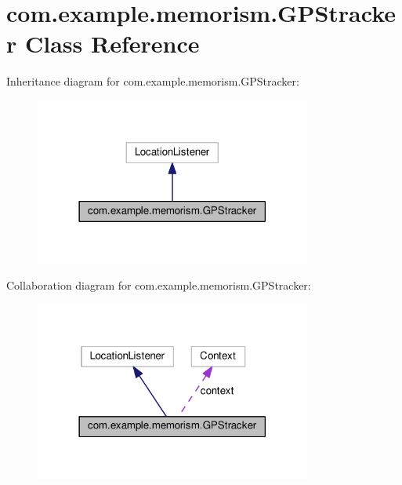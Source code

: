 \hypertarget{classcom_1_1example_1_1memorism_1_1_g_p_stracker}{}\section{com.\+example.\+memorism.\+G\+P\+Stracker Class Reference}
\label{classcom_1_1example_1_1memorism_1_1_g_p_stracker}


Inheritance diagram for com.\+example.\+memorism.\+G\+P\+Stracker\+:
\nopagebreak
\begin{figure}[H]
\begin{center}
\leavevmode
\includegraphics[width=258pt]{dc/d42/classcom_1_1example_1_1memorism_1_1_g_p_stracker__inherit__graph}
\end{center}
\end{figure}


Collaboration diagram for com.\+example.\+memorism.\+G\+P\+Stracker\+:
\nopagebreak
\begin{figure}[H]
\begin{center}
\leavevmode
\includegraphics[width=258pt]{de/df9/classcom_1_1example_1_1memorism_1_1_g_p_stracker__coll__graph}
\end{center}
\end{figure}
